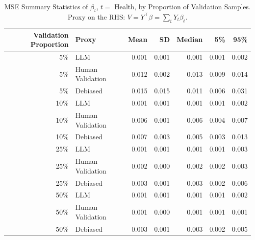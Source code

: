 \begin{table}

\caption{MSE Summary Statistics of $\beta_{t}$, $t=$ Health, by Proportion of Validation Samples.
      Proxy on the RHS: $V = Y^\top \beta = \sum_{t} Y_t \beta_t$.}
\centering
\begin{tabular}[t]{rlrrrrr}
\toprule
Validation Proportion & Proxy & Mean & SD & Median & 5\% & 95\%\\
\midrule
5\% & LLM & 0.001 & 0.001 & 0.001 & 0.001 & 0.002\\
5\% & Human Validation & 0.012 & 0.002 & 0.013 & 0.009 & 0.014\\
5\% & Debiased & 0.015 & 0.015 & 0.011 & 0.006 & 0.031\\
10\% & LLM & 0.001 & 0.001 & 0.001 & 0.001 & 0.002\\
10\% & Human Validation & 0.006 & 0.001 & 0.006 & 0.004 & 0.007\\
10\% & Debiased & 0.007 & 0.003 & 0.005 & 0.003 & 0.013\\
25\% & LLM & 0.001 & 0.001 & 0.001 & 0.001 & 0.003\\
25\% & Human Validation & 0.002 & 0.000 & 0.002 & 0.002 & 0.003\\
25\% & Debiased & 0.003 & 0.001 & 0.003 & 0.002 & 0.006\\
50\% & LLM & 0.001 & 0.001 & 0.001 & 0.001 & 0.002\\
50\% & Human Validation & 0.001 & 0.000 & 0.001 & 0.001 & 0.001\\
50\% & Debiased & 0.003 & 0.001 & 0.003 & 0.002 & 0.005\\
\bottomrule
\end{tabular}
\end{table}
